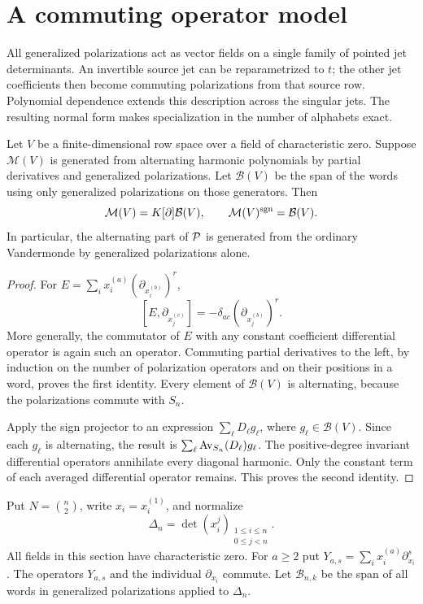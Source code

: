 \section{A commuting operator model}
\label{sec:r3-normal-form}

All generalized polarizations act as vector fields on a single
family of pointed jet determinants.  An invertible source jet can
be reparametrized to $t$; the other jet coefficients then become
commuting polarizations from that source row.  Polynomial dependence
extends this description across the singular jets.  The resulting
normal form makes specialization in the number of alphabets exact.

\begin{lemma}\label{lem:r2-normal-order}
Let $V$ be a finite-dimensional row space over a field of
characteristic zero.  Suppose $\mathcal M(V)$ is generated from alternating harmonic
polynomials by partial derivatives and generalized polarizations.
Let $\mathcal B(V)$ be the span of the words using only generalized
polarizations on those generators.  Then
\[
 \mathcal M(V)=K[\partial]\mathcal B(V),
 \qquad
 \mathcal M(V)^{\operatorname{sgn}}=\mathcal B(V).
\]
In particular, the alternating part of $\mathcal P$ is generated from the
ordinary Vandermonde by generalized polarizations alone.
\end{lemma}

\begin{proof}
For $E=\sum_i x_i^{(a)}(\partial_{x_i^{(b)}})^r$,
\[
 [E,\partial_{x_j^{(c)}}]
       =-\delta_{ac}(\partial_{x_j^{(b)}})^r.
\]
More generally, the commutator of $E$ with any constant coefficient
differential operator is again such an operator.  Commuting partial
derivatives to the left, by induction on the number of polarization
operators and on their positions in a word, proves the first identity.
Every element of $\mathcal B(V)$ is alternating, because the
polarizations commute with $S_n$.

Apply the sign projector to an expression $\sum_\ell D_\ell g_\ell$,
where $g_\ell\in\mathcal B(V)$.  Since each $g_\ell$ is alternating,
the result is $\sum_\ell\operatorname{Av}_{S_n}(D_\ell)g_\ell$.  The positive-degree
invariant differential operators annihilate every diagonal harmonic.
Only the constant term of each averaged differential operator remains.
This proves the second identity.
\end{proof}


Put $N=\binom n2$, write $x_i=x_i^{(1)}$, and normalize
\[
 \Delta_n=\det(x_i^j)_{\substack{1\leq i\leq n\\0\leq j<n}}.
\]
All fields in this section have characteristic zero.  For $a\geq2$ put
$Y_{a,s}=\sum_i x_i^{(a)}\partial_{x_i}^{s}$.
The operators $Y_{a,s}$ and the individual $\partial_{x_i}$ commute.
Let $\mathcal B_{n,k}$ be the span of all words in generalized
polarizations applied to $\Delta_n$.

